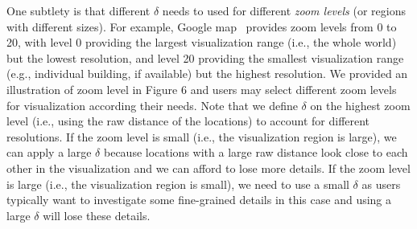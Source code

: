 

One subtlety is that different $\delta$ needs to used for different \emph{zoom levels} (or regions with different sizes).
For example, Google map~\cite{googlemap} provides zoom levels from 0 to 20, with level 0 providing the largest visualization range (i.e., the whole world) but the lowest resolution, and level 20 providing the smallest visualization range (e.g., individual building, if available) but the highest resolution.
We provided an illustration of zoom level in Figure 6 and users may select different zoom levels for visualization according their needs.
Note that we define $\delta$ on the highest zoom level (i.e., using the raw distance of the locations) to account for different resolutions.
If the zoom level is small (i.e., the visualization region is large), we can apply a large $\delta$ because locations with a large raw distance look close to each other in the visualization and we can afford to lose more details.
If the zoom level is large (i.e., the visualization region is small), we need to use a small $\delta$ as users typically want to investigate some fine-grained details in this case and using a large $\delta$ will lose these details.




